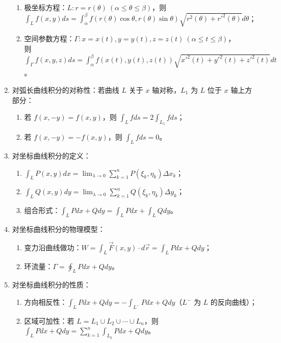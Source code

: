 \documentclass[UTF8]{ctexart}
\theoremstyle{remark}
\begin{document}
\begin{enumerate}
\begin{enumerate}
				\item 极坐标方程：\(L: r = r(\theta) \ (\alpha \leq \theta \leq \beta)\)，则 \(\int_{L} f(x, y) ds = \int_{\alpha}^{\beta} f(r(\theta)\cos\theta, r(\theta)\sin\theta) \sqrt{r^2(\theta) + r'^2(\theta)} d\theta\)；
				\item 空间参数方程：\(\Gamma: x = x(t), y = y(t), z = z(t) \ (\alpha \leq t \leq \beta)\)，\\则 \(\int_{\Gamma} f(x, y, z) ds = \int_{\alpha}^{\beta} f(x(t), y(t), z(t)) \sqrt{x'^2(t) + y'^2(t) + z'^2(t)} dt\)。
			\end{enumerate}
			\item 对弧长曲线积分的对称性：若曲线 \(L\) 关于 \(x\) 轴对称，\(L_1\) 为 \(L\) 位于 \(x\) 轴上方部分：
			\begin{enumerate}
				\item 若 \(f(x, -y) = f(x, y)\)，则 \(\int_{L} f ds = 2\int_{L_1} f ds\)；
				\item 若 \(f(x, -y) = -f(x, y)\)，则 \(\int_{L} f ds = 0\)。
			\end{enumerate}
			\item 对坐标曲线积分的定义：
			\begin{enumerate}
				\item \(\int_{L} P(x, y) dx = \lim_{\lambda \to 0} \sum_{k=1}^{n} P(\xi_k, \eta_k) \Delta x_k\)；
				\item \(\int_{L} Q(x, y) dy = \lim_{\lambda \to 0} \sum_{k=1}^{n} Q(\xi_k, \eta_k) \Delta y_k\)；
				\item 组合形式：\(\int_{L} P dx + Q dy = \int_{L} P dx + \int_{L} Q dy\)。
			\end{enumerate}
			\item 对坐标曲线积分的物理模型：
			\begin{enumerate}
				\item 变力沿曲线做功：\(W = \int_{L} \vec{F}(x, y) \cdot d\vec{r} = \int_{L} P dx + Q dy\)；
				\item 环流量：\(\Gamma = \oint_{L} P dx + Q dy\)。
			\end{enumerate}
			\item 对坐标曲线积分的性质：
			\begin{enumerate}
				\item 方向相反性：\(\int_{L} P dx + Q dy = -\int_{L^-} P dx + Q dy\)（\(L^-\) 为 \(L\) 的反向曲线）；
				\item 区域可加性：若 \(L = L_1 \cup L_2 \cup \cdots \cup L_n\)，则 \(\int_{L} P dx + Q dy = \sum_{k=1}^{n} \int_{L_k} P dx + Q dy\)。
			\end{enumerate}

\end{enumerate}
\end{document}
